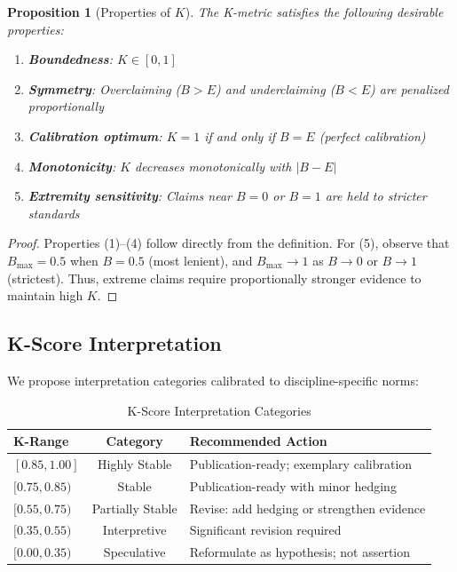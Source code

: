 \documentclass[11pt,a4paper]{article}
\newtheorem{proposition}{Proposition}[section]
\begin{document}
\begin{proposition}[Properties of $K$]
\label{prop:K-properties}
The K-metric satisfies the following desirable properties:
\begin{enumerate}
    \item \textbf{Boundedness}: $K \in [0, 1]$
    \item \textbf{Symmetry}: Overclaiming ($B > E$) and underclaiming ($B < E$) are penalized proportionally
    \item \textbf{Calibration optimum}: $K = 1$ if and only if $B = E$ (perfect calibration)
    \item \textbf{Monotonicity}: $K$ decreases monotonically with $|B - E|$
    \item \textbf{Extremity sensitivity}: Claims near $B = 0$ or $B = 1$ are held to stricter standards
\end{enumerate}
\end{proposition}

\begin{proof}
Properties (1)--(4) follow directly from the definition. For (5), observe that $B_{\max} = 0.5$ when $B = 0.5$ (most lenient), and $B_{\max} \to 1$ as $B \to 0$ or $B \to 1$ (strictest). Thus, extreme claims require proportionally stronger evidence to maintain high $K$.
\end{proof}

\subsection{K-Score Interpretation}

We propose interpretation categories calibrated to discipline-specific norms:

\begin{table}[h]
\centering
\caption{K-Score Interpretation Categories}
\label{tab:K-interpretation}
\begin{tabular}{lcl}
\toprule
\textbf{K-Range} & \textbf{Category} & \textbf{Recommended Action} \\
\midrule
$[0.85, 1.00]$ & Highly Stable & Publication-ready; exemplary calibration \\
$[0.75, 0.85)$ & Stable & Publication-ready with minor hedging \\
$[0.55, 0.75)$ & Partially Stable & Revise: add hedging or strengthen evidence \\
$[0.35, 0.55)$ & Interpretive & Significant revision required \\
$[0.00, 0.35)$ & Speculative & Reformulate as hypothesis; not assertion \\
\bottomrule
\end{tabular}
\end{table}
\end{document}
